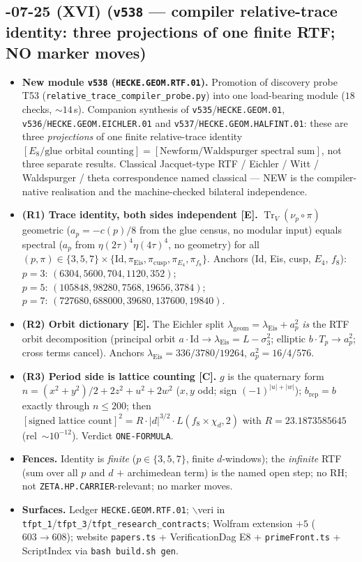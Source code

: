 \documentclass[11pt]{article}
\providecommand{\mE}{\textbf{[E]}}\providecommand{\mC}{\textbf{[C]}}
\begin{document}
\subsection*{-07-25 (XVI) (\texttt{v538} --- compiler relative-trace identity: three projections of one finite RTF; NO marker moves)}
\begin{itemize}[leftmargin=1.5em]
\item \textbf{New module \texttt{v538} (\texttt{HECKE.GEOM.RTF.01}).} Promotion of discovery probe T53
(\allowbreak\texttt{relative\_trace\_compiler\_probe.py}) into one load-bearing module ($18$ checks, $\sim14$\,s).
Companion synthesis of \texttt{v535}/\texttt{HECKE.GEOM.01}, \texttt{v536}/\texttt{HECKE.GEOM.EICHLER.01}
and \texttt{v537}/\texttt{HECKE.GEOM.HALFINT.01}: these are three \emph{projections} of one finite
relative-trace identity
$[\text{$E_8$/glue orbital counting}]=[\text{Newform/Waldspurger spectral sum}]$,
not three separate results. Classical Jacquet-type RTF / Eichler / Witt / Waldspurger / theta
correspondence named classical --- NEW is the compiler-native realisation and the machine-checked
bilateral independence.
\item \textbf{(R1) Trace identity, both sides independent \mE.}
$\operatorname{Tr}_V(\nu_p\circ\pi)$ geometric ($a_p=-c(p)/8$ from the glue census, no modular input)
equals spectral ($a_p$ from $\eta(2\tau)^4\eta(4\tau)^4$, no geometry) for all
$(p,\pi)\in\{3,5,7\}\times\{\mathrm{Id},\pi_{\mathrm{Eis}},\pi_{\mathrm{cusp}},\pi_{E_4},\pi_{f_8}\}$.
Anchors (Id, Eis, cusp, $E_4$, $f_8$):
$p{=}3{:}\,(6304,5600,704,1120,352)$;
$p{=}5{:}\,(105848,98280,7568,19656,3784)$;
$p{=}7{:}\,(727680,688000,39680,137600,19840)$.
\item \textbf{(R2) Orbit dictionary \mE.} The Eichler split
$\lambda_{\mathrm{geom}}=\lambda_{\mathrm{Eis}}+a_p^2$ \emph{is} the RTF orbit decomposition
(principal orbit $a\cdot\mathrm{Id}\to\lambda_{\mathrm{Eis}}=L-\sigma_3^2$; elliptic $b\cdot T_p\to a_p^2$;
cross terms cancel). Anchors $\lambda_{\mathrm{Eis}}=336/3780/19264$, $a_p^2=16/4/576$.
\item \textbf{(R3) Period side is lattice counting \mC.}
$g$ is the quaternary form $n=(x^2+y^2)/2+2z^2+u^2+2w^2$ ($x,y$ odd; sign $(-1)^{|u|+|w|}$);
$b_{\mathrm{rep}}=b$ exactly through $n\le200$; then
$[\text{signed lattice count}]^2=R\cdot|d|^{3/2}\cdot L(f_8\times\chi_d,2)$ with
$R=23.1873585645$ (rel~$\sim10^{-12}$). Verdict \texttt{ONE-FORMULA}.
\item \textbf{Fences.} Identity is \emph{finite} ($p\in\{3,5,7\}$, finite $d$-windows); the
\emph{infinite} RTF (sum over all $p$ and $d$ $+$ archimedean term) is the named open step; no RH;
not \texttt{ZETA.HP.CARRIER}-relevant; no marker moves.
\item \textbf{Surfaces.} Ledger \texttt{HECKE.GEOM.RTF.01}; $\backslash$veri in
\texttt{tfpt\_1}/\texttt{tfpt\_3}/\texttt{tfpt\_research\_contracts}; Wolfram extension $+5$
($603\to608$); website \texttt{papers.ts} + VerificationDag E8 + \texttt{primeFront.ts} +
ScriptIndex via \texttt{bash build.sh gen}.
\end{itemize}
\end{document}
